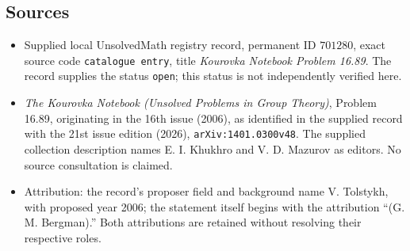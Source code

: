 \documentclass[11pt]{article}
\begin{document}
\subsection{Sources}
\begin{itemize}
\item Supplied local UnsolvedMath registry record, permanent ID \(701280\), exact source code \texttt{catalogue entry}, title \emph{Kourovka Notebook Problem 16.89}. The record supplies the status \texttt{open}; this status is not independently verified here.
\item \emph{The Kourovka Notebook (Unsolved Problems in Group Theory)}, Problem 16.89, originating in the 16th issue (2006), as identified in the supplied record with the 21st issue edition (2026), \texttt{arXiv:1401.0300v48}. The supplied collection description names E. I. Khukhro and V. D. Mazurov as editors. No source consultation is claimed.
\item Attribution: the record's proposer field and background name V. Tolstykh, with proposed year 2006; the statement itself begins with the attribution ``(G. M. Bergman).'' Both attributions are retained without resolving their respective roles.
\end{itemize}
\end{document}
